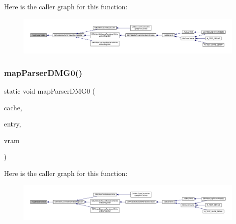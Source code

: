 Here is the caller graph for this function\+:
\nopagebreak
\begin{figure}[H]
\begin{center}
\leavevmode
\includegraphics[width=350pt]{gb_2renderers_2cache-set_8c_a1120d205c5f595ef19ae432fc78b9d96_icgraph}
\end{center}
\end{figure}
\mbox{\label{gb_2renderers_2cache-set_8c_a048d8d609b74b62fd9a0812bcb0474a0}} 
\subsubsection{\texorpdfstring{map\+Parser\+D\+M\+G0()}{mapParserDMG0()}}
{\footnotesize\ttfamily static void map\+Parser\+D\+M\+G0 (\begin{DoxyParamCaption}\item[{struct m\+Map\+Cache $\ast$}]{cache,  }\item[{struct m\+Map\+Cache\+Entry $\ast$}]{entry,  }\item[{void $\ast$}]{vram }\end{DoxyParamCaption})\hspace{0.3cm}{\ttfamily [static]}}

Here is the caller graph for this function\+:
\nopagebreak
\begin{figure}[H]
\begin{center}
\leavevmode
\includegraphics[width=350pt]{gb_2renderers_2cache-set_8c_a048d8d609b74b62fd9a0812bcb0474a0_icgraph}
\end{center}
\end{figure}
\mbox{\label{gb_2renderers_2cache-set_8c_a0a1e89b599746b796592de6e1eab8e2b}} 

